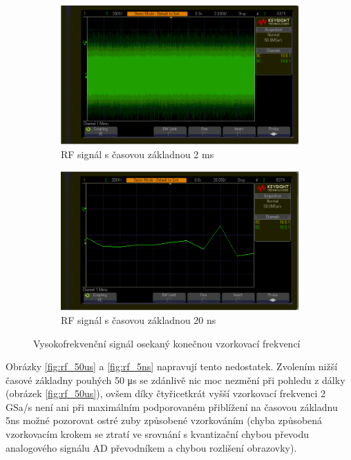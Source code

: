 \documentclass[twoside]{article}
\begin{document}
\begin{figure}[htbp]
	\centering
	\begin{subfigure}{0.45\textwidth}
		\includegraphics[width=\linewidth]{rf_captured20ms_view20ms.png                      }
		\caption{RF signál s časovou základnou 2 ms}
		\label{fig:rf_20ms}
	\end{subfigure}
	\begin{subfigure}{0.45\textwidth}
		\includegraphics[width=\linewidth]{rf_captured20ms_view20ns.png                    }
		\caption{RF signál s časovou základnou 20 ns}
		\label{fig:rf_20ns}
	\end{subfigure}
	\caption{Vysokofrekvenční signál osekaný konečnou vzorkovací frekvencí}
\end{figure}

Obrázky \ref{fig:rf_50us} a \ref{fig:rf_5ns} napravují tento nedostatek. Zvolením nižší časové základny pouhých 50 \si{\micro\second}
se zdánlivě nic moc nezmění při pohledu z dálky (obrázek \ref{fig:rf_50us}), ovšem díky čtyřicetkrát vyšší vzorkovací frekvenci 2 GSa/s
není ani při maximálním podporovaném přiblížení na časovou základnu 5ns možné pozorovat ostré zuby způsobené vzorkováním (chyba
způsobená vzorkovacím krokem se ztratí ve srovnání s kvantizační chybou převodu analogového signálu AD převodníkem a chybou rozlišení
obrazovky). 
\end{document}
